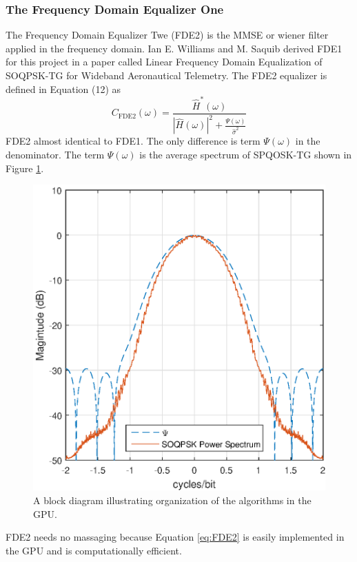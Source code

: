 \subsubsection{The Frequency Domain Equalizer One}
The Frequency Domain Equalizer Twe (FDE2) is the MMSE or wiener filter applied in the frequency domain.
Ian E. Williams and M. Saquib derived FDE1 for this project in a paper called Linear Frequency Domain Equalization of SOQPSK-TG for Wideband Aeronautical Telemetry.
The FDE2 equalizer is defined in Equation (12) as
\begin{equation}
C_\text{FDE2}(\omega) = \frac{\hat{H}^\ast(\omega)}{|\hat{H}(\omega)|^2+\frac{\Psi(\omega)}{\hat{\sigma}^2}}
\label{eq:FDE2}
\end{equation}
FDE2 almost identical to FDE1.
The only difference is term $\Psi(\omega)$ in the denominator. 
The term $\Psi(\omega)$ is the average spectrum of SPQOSK-TG shown in Figure \ref{fig:SOQPSK_spectrum}.
\begin{figure}
	\centering\includegraphics[width=5in]{figures/equations/FDE2_spectrum_PSI.eps}
	\caption{A block diagram illustrating organization of the algorithms in the GPU.}
	\label{fig:SOQPSK_spectrum}
\end{figure}
FDE2 needs no massaging because Equation \eqref{eq:FDE2} is easily implemented in the GPU and is computationally efficient.